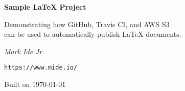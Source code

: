 \documentclass[12pt,letterpaper]{report}
\begin{document}
\begin{titlepage}
  \centering
  {\huge\bfseries Sample \LaTeX{} Project\par}
  \vspace{.5in}
  Demonstrating how GitHub, Travis CI, and AWS S3\\
  can be used to automatically publish \LaTeX{} documents.
  \vfill

  {\Large\itshape Mark Ide Jr.\par}
  {\texttt{https://www.mide.io/}\par}
  \vfill

  {\large Built on \today\par}
\end{titlepage}
\end{document}
